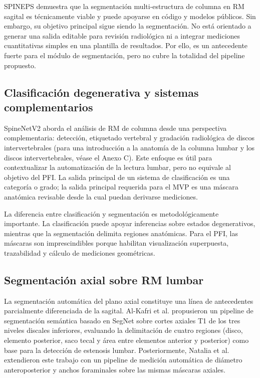 SPINEPS demuestra que la segmentación multi-estructura de columna en RM sagital es técnicamente viable y puede apoyarse en código y modelos públicos. Sin embargo, su objetivo principal sigue siendo la segmentación. No está orientado a generar una salida editable para revisión radiológica ni a integrar mediciones cuantitativas simples en una plantilla de resultados. Por ello, es un antecedente fuerte para el módulo de segmentación, pero no cubre la totalidad del pipeline propuesto.

\subsection{Clasificación degenerativa y sistemas complementarios}

SpineNetV2 aborda el análisis de RM de columna desde una perspectiva complementaria: detección, etiquetado vertebral y gradación radiológica de discos intervertebrales \parencite{jamaludin_spinenet_2017,windsor_spinenet_2024} (para una introducción a la anatomía de la columna lumbar y los discos intervertebrales, véase el Anexo C). Este enfoque es útil para contextualizar la automatización de la lectura lumbar, pero no equivale al objetivo del PFI. La salida principal de un sistema de clasificación es una categoría o grado; la salida principal requerida para el MVP es una máscara anatómica revisable desde la cual puedan derivarse mediciones.

La diferencia entre clasificación y segmentación es metodológicamente importante. La clasificación puede apoyar inferencias sobre estados degenerativos, mientras que la segmentación delimita regiones anatómicas. Para el PFI, las máscaras son imprescindibles porque habilitan visualización superpuesta, trazabilidad y cálculo de mediciones geométricas.

\subsection{Segmentación axial sobre RM lumbar}

La segmentación automática del plano axial constituye una línea de antecedentes parcialmente diferenciada de la sagital. Al-Kafri et al. \parencite{alkafri_sudirman_boundary_2019} propusieron un pipeline de segmentación semántica basado en SegNet sobre cortes axiales T1 de los tres niveles discales inferiores, evaluando la delimitación de cuatro regiones (disco, elemento posterior, saco tecal y área entre elementos anterior y posterior) como base para la detección de estenosis lumbar. Posteriormente, Natalia et al. \parencite{natalia_measurement_2020} extendieron este trabajo con un pipeline de medición automática de diámetro anteroposterior y anchos foraminales sobre las mismas máscaras axiales.

